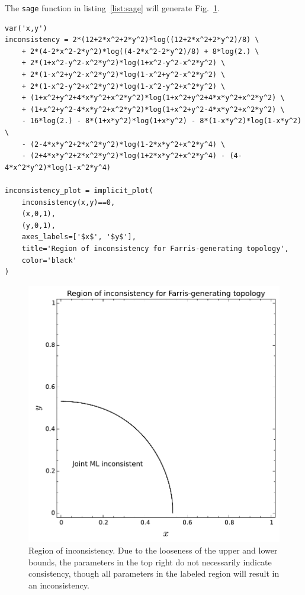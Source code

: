 \documentclass[a4paper]{article}
\begin{document}
The \texttt{sage} function in listing~\ref{list:sage} will generate Fig.~\ref{fig:inconsistency-farris}.

\begin{table}
    \begin{center}
\begin{verbatim}
var('x,y')
inconsistency = 2*(12+2*x^2+2*y^2)*log((12+2*x^2+2*y^2)/8) \
    + 2*(4-2*x^2-2*y^2)*log((4-2*x^2-2*y^2)/8) + 8*log(2.) \
    + 2*(1+x^2-y^2-x^2*y^2)*log(1+x^2-y^2-x^2*y^2) \
    + 2*(1-x^2+y^2-x^2*y^2)*log(1-x^2+y^2-x^2*y^2) \
    + 2*(1-x^2-y^2+x^2*y^2)*log(1-x^2-y^2+x^2*y^2) \
    + (1+x^2+y^2+4*x*y^2+x^2*y^2)*log(1+x^2+y^2+4*x*y^2+x^2*y^2) \
    + (1+x^2+y^2-4*x*y^2+x^2*y^2)*log(1+x^2+y^2-4*x*y^2+x^2*y^2) \
    - 16*log(2.) - 8*(1+x*y^2)*log(1+x*y^2) - 8*(1-x*y^2)*log(1-x*y^2) \
    - (2-4*x*y^2+2*x^2*y^2)*log(1-2*x*y^2+x^2*y^4) \
    - (2+4*x*y^2+2*x^2*y^2)*log(1+2*x*y^2+x^2*y^4) - (4-4*x^2*y^2)*log(1-x^2*y^4)

inconsistency_plot = implicit_plot(
    inconsistency(x,y)==0,
    (x,0,1),
    (y,0,1),
    axes_labels=['$x$', '$y$'],
    title='Region of inconsistency for Farris-generating topology',
    color='black'
)
\end{verbatim}
    \end{center}
\caption{Sage code to generate Fig.~\ref{fig:inconsistency-farris}}
\label{list:sage}
\end{table}

\begin{figure}
\centering
\includegraphics[width=.9\textwidth]{analytic-inconsistency}
\caption{
    Region of inconsistency.
    Due to the looseness of the upper and lower bounds, the parameters in the top right do not necessarily indicate consistency, though all parameters in the labeled region will result in an inconsistency.
}
\label{fig:inconsistency-farris}
\end{figure}
\end{document}
